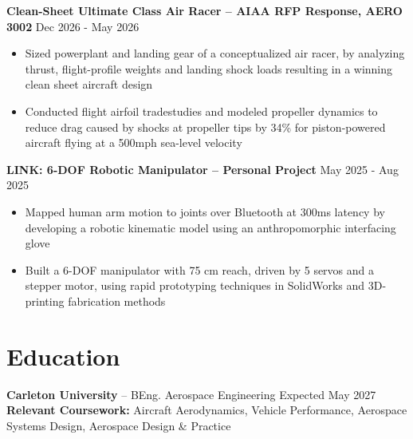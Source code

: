 \documentclass[11pt]{article}       %
\begin{document}
\textbf{Clean-Sheet Ultimate Class Air Racer -- AIAA RFP Response, AERO 3002} \hfill 
\textf Dec 2026 - May 2026 \\
\vspace{-9pt}
\begin{itemize}
  \item Sized powerplant and landing gear of a conceptualized air racer, by analyzing thrust, flight-profile weights and landing shock loads resulting in a winning clean sheet aircraft design
  \item Conducted flight airfoil tradestudies and modeled propeller dynamics to reduce drag caused by shocks at propeller tips by 34\% for piston-powered aircraft flying at a 500mph sea-level velocity 
\end{itemize}
 
\textbf{LINK: 6-DOF Robotic Manipulator -- Personal Project} 
\hfill \textf May 2025 - Aug 2025 \\
\vspace{-9pt}
\begin{itemize}
  \item Mapped human arm motion to joints over Bluetooth at 300ms latency by developing a robotic kinematic model using an anthropomorphic interfacing glove
  \item Built a 6-DOF manipulator with 75 cm reach, driven by 5 servos and a stepper motor, using rapid prototyping techniques in SolidWorks and 3D-printing fabrication methods
\end{itemize}
 
\vspace{-15.5pt}
 
\section*{Education}
\textbf{Carleton University} -- BEng. Aerospace Engineering 
\hfill Expected May 2027 \\
\textbf{Relevant Coursework:} Aircraft Aerodynamics, Vehicle Performance, Aerospace Systems Design, Aerospace Design \& Practice
 
\end{document}
